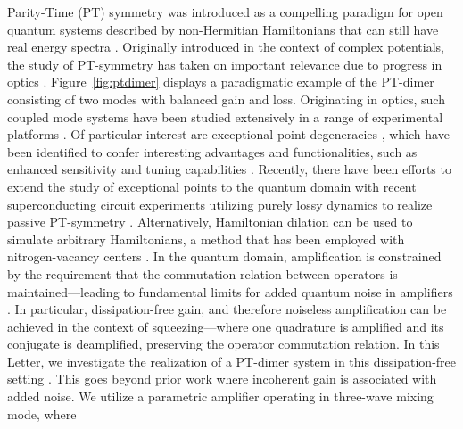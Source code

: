 \documentclass[prl,twocolumn,english,superscriptaddress,floatfix,longbibliography]{revtex4-2}
\begin{document}
Parity-Time (PT) symmetry was introduced as a compelling paradigm for open quantum systems described by non-Hermitian Hamiltonians that can still have real energy spectra \cite{Bend98}.  Originally introduced in the context of complex potentials, the study of PT-symmetry has taken on important relevance due to progress in optics \cite{el2018}.  Figure~\ref{fig:ptdimer} displays a paradigmatic example of the PT-dimer consisting of two modes with balanced gain and loss. %
Originating in optics, such coupled mode systems have been studied extensively in a range of experimental platforms \cite{guo09,rute10,peng14pt,hoda14, zeun15,Li2019,xiao17}. Of particular interest are exceptional point degeneracies \cite{zdem19,Miri19}, which have been identified to confer interesting advantages and functionalities, such as enhanced sensitivity \cite{wier14,hoda17,chen17} and tuning capabilities \cite{Xu16}. Recently, there have been efforts to extend the study of exceptional points to the quantum domain with %
 recent superconducting circuit experiments utilizing purely lossy dynamics to realize passive PT-symmetry \cite{nagh19,Chen21,Chen22,Abb22}. Alternatively, Hamiltonian dilation \cite{Wang2020} can be used to simulate arbitrary Hamiltonians, a method that has been employed with nitrogen-vacancy centers \cite{Wu2019, Liu21}.  %
In the quantum domain, amplification is constrained by the requirement that the commutation relation between operators is maintained---leading to fundamental limits for added quantum noise in amplifiers \cite{Clerk2010}. In particular, dissipation-free gain, and therefore noiseless amplification can be achieved in the context of squeezing---where one quadrature is amplified and its conjugate is deamplified, preserving the operator commutation relation. In this Letter, we investigate the realization of a PT-dimer system in this dissipation-free setting \cite{Yue2019,Wang2019,Luo2022}. This goes beyond prior work where incoherent gain is associated with added noise. We utilize a parametric amplifier \cite{Aumentado2020,Yamamoto2008,CastellanosBeltran2008} operating in three-wave mixing mode, where %
\end{document}
